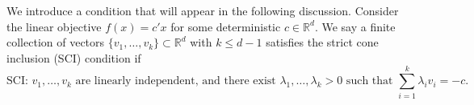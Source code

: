 \documentclass[mnsc,blindrev]{informs4} %
\newcommand{\R}{\mathbb{R}}
\begin{document}



We introduce a condition that will appear in the following discussion. Consider the linear objective $f(x)=c'x$ for some deterministic $c\in \R^d$. We say a finite collection of vectors $\{v_1,\ldots,v_k\}\subset \R^d$ with $k\leq d-1$ satisfies the strict cone inclusion (SCI) condition if
\begin{equation*}%
\text{SCI: }v_1,\ldots,v_k\text{ are linearly independent, and there exist }\lambda_1,\ldots,
\lambda_k>0\text{ such that }\sum_{i=1}^k\lambda_iv_i=-c.
\end{equation*}

\smallskip


\end{document}
